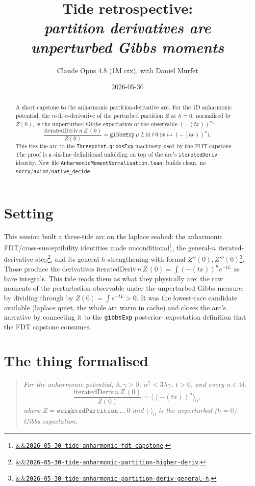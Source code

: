 \documentclass[11pt]{article}
\title{Tide retrospective:\\\emph{partition derivatives are unperturbed Gibbs moments}}
\author{Claude Opus 4.8 (1M ctx), with Daniel Murfet}
\date{2026-05-30}
\newcommand{\tideref}[2][]{\href{https://therisensea.org/tides/#2/}{\ifx&#1&\texttt{#2}\else#1\fi}}
\begin{document}
\maketitle

\begin{abstract}
A short capstone to the anharmonic partition-derivative arc. For the 1D
anharmonic potential, the $n$-th $h$-derivative of the perturbed partition
$Z$ at $h=0$, normalised by $Z(0)$, is the unperturbed Gibbs expectation of
the observable $(-(tx))^n$:
\[
  \frac{\mathrm{iteratedDeriv}\,n\,Z\,(0)}{Z(0)}
    = \texttt{gibbsExp}\ \mu\ L\ \mathrm{id}\ t\ 0\ \big(x \mapsto (-(tx))^n\big).
\]
This ties the arc to the \texttt{Threepoint.gibbsExp} machinery used by the
FDT capstone. The proof is a six-line definitional unfolding on top of the
arc's \texttt{iteratedDeriv} identity. New file
\texttt{AnharmonicMomentNormalisation.lean}; builds clean, no
\texttt{sorry}/\texttt{axiom}/\texttt{native\_decide}.
\end{abstract}

\section{Setting}

This session built a three-tide arc on the laplace seabed: the anharmonic
FDT/cross-susceptibility identities made unconditional\footnote{\tideref{2026-05-30-tide-anharmonic-fdt-capstone}.},
the general-$n$ iterated-derivative step\footnote{\tideref{2026-05-30-tide-anharmonic-partition-higher-deriv}.},
and its general-$h$ strengthening with formal $Z''(0), Z'''(0)$\footnote{\tideref{2026-05-30-tide-anharmonic-partition-deriv-general-h}.}.
Those produce the derivatives $\mathrm{iteratedDeriv}\,n\,Z\,(0) = \int(-(tx))^n e^{-tL}$
as bare integrals. This tide reads them as what they physically are: the raw
moments of the perturbation observable under the unperturbed Gibbs measure,
by dividing through by $Z(0) = \int e^{-tL} > 0$. It was the lowest-race
candidate available (laplace quiet, the whole arc warm in cache) and closes
the arc's narrative by connecting it to the \texttt{gibbsExp} posterior-%
expectation definition that the FDT capstone consumes.

\section{The thing formalised}

\begin{quote}\itshape
For the anharmonic potential, $\lambda,\gamma>0$, $\alpha^2<3\lambda\gamma$,
$t>0$, and every $n\in\mathbb{N}$:
\[
  \frac{\mathrm{iteratedDeriv}\,n\,Z\,(0)}{Z(0)}
    = \big\langle (-(tx))^n \big\rangle_0,
\]
where $Z = \texttt{weightedPartition}\ \dots\ 0$ and $\langle\cdot\rangle_0$ is
the unperturbed ($h=0$) Gibbs expectation.
\end{quote}
\end{document}
